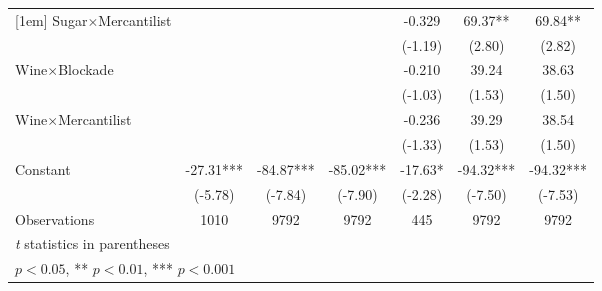 {\begin{tabular}{l*{6}{c}}
[1em]
Sugar$\times$Mercantilist&                     &                     &                     &      -0.329         &       69.37** &       69.84** \\
                    &                     &                     &                     &     (-1.19)         &      (2.80)         &      (2.82)         \\
[1em]
Wine$\times$Blockade&                     &                     &                     &      -0.210         &       39.24         &       38.63         \\
                    &                     &                     &                     &     (-1.03)         &      (1.53)         &      (1.50)         \\
[1em]
Wine$\times$Mercantilist&                     &                     &                     &      -0.236         &       39.29         &       38.54         \\
                    &                     &                     &                     &     (-1.33)         &      (1.53)         &      (1.50)         \\
[1em]
Constant            &      -27.31***&      -84.87***&      -85.02***&      -17.63*  &      -94.32***&      -94.32***\\
                    &     (-5.78)         &     (-7.84)         &     (-7.90)         &     (-2.28)         &     (-7.50)         &     (-7.53)         \\
\hline
Observations        &        1010         &        9792         &        9792         &         445         &        9792         &        9792         \\
\hline\hline
\multicolumn{7}{l}{\footnotesize \textit{t} statistics in parentheses}\\
\multicolumn{7}{l}{\footnotesize * \(p<0.05\), ** \(p<0.01\), *** \(p<0.001\)}\\
\end{tabular}
}
